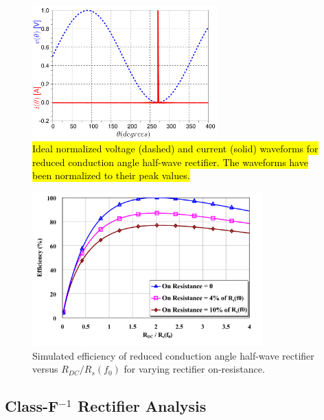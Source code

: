 \begin{figure}
  \begin{center}
  \includegraphics[width=2.8in]{pdf/02.pdf}
  \caption{\hl{Ideal normalized voltage (dashed) and current (solid) waveforms for reduced conduction angle half-wave rectifier. The waveforms have been normalized to their peak values.}}\label{waveforms}
  \end{center}
\end{figure}

\begin{figure}
  \begin{center}
  \includegraphics[width=3.5in]{pdf/03.pdf}
  \caption{Simulated efficiency of reduced conduction angle half-wave rectifier versus $R_{DC} / R_s(f_0)$ for varying rectifier on-resistance.}\label{sim_opt_eff}
  \end{center}
\end{figure}










\subsection {Class-F$^{-1}$ Rectifier Analysis}

